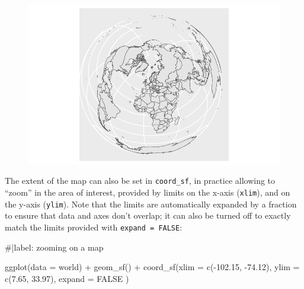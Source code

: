 \documentclass[
  letterpaper,
  DIV=11,
  numbers=noendperiod]{scrartcl}
\newenvironment{Shaded}{\begin{snugshade}}{\end{snugshade}}
\newcommand{\AttributeTok}[1]{\textcolor[rgb]{0.40,0.45,0.13}{#1}}
\newcommand{\CommentTok}[1]{\textcolor[rgb]{0.37,0.37,0.37}{#1}}
\newcommand{\ConstantTok}[1]{\textcolor[rgb]{0.56,0.35,0.01}{#1}}
\newcommand{\FloatTok}[1]{\textcolor[rgb]{0.68,0.00,0.00}{#1}}
\newcommand{\FunctionTok}[1]{\textcolor[rgb]{0.28,0.35,0.67}{#1}}
\newcommand{\NormalTok}[1]{\textcolor[rgb]{0.00,0.23,0.31}{#1}}
\newcommand{\SpecialCharTok}[1]{\textcolor[rgb]{0.37,0.37,0.37}{#1}}
\begin{document}
\begin{figure}[H]

{\centering \includegraphics{Introduction-to-mapping_files/figure-pdf/unnamed-chunk-11-2.pdf}

}

\end{figure}

The extent of the map can also be set in \texttt{coord\_sf}, in practice
allowing to ``zoom'' in the area of interest, provided by limits on the
x-axis (\texttt{xlim}), and on the y-axis (\texttt{ylim}). Note that the
limits are automatically expanded by a fraction to ensure that data and
axes don't overlap; it can also be turned off to exactly match the
limits provided with \texttt{expand\ =\ FALSE}:

\begin{Shaded}
\begin{Highlighting}[]
\CommentTok{\#|label: zooming on a map}

\FunctionTok{ggplot}\NormalTok{(}\AttributeTok{data =}\NormalTok{ world) }\SpecialCharTok{+}     
  \FunctionTok{geom\_sf}\NormalTok{() }\SpecialCharTok{+}     
  \FunctionTok{coord\_sf}\NormalTok{(}\AttributeTok{xlim =} \FunctionTok{c}\NormalTok{(}\SpecialCharTok{{-}}\FloatTok{102.15}\NormalTok{, }\SpecialCharTok{{-}}\FloatTok{74.12}\NormalTok{), }
           \AttributeTok{ylim =} \FunctionTok{c}\NormalTok{(}\FloatTok{7.65}\NormalTok{, }\FloatTok{33.97}\NormalTok{), }
           \AttributeTok{expand =} \ConstantTok{FALSE}
\NormalTok{           ) }
\end{Highlighting}
\end{Shaded}
\end{document}
